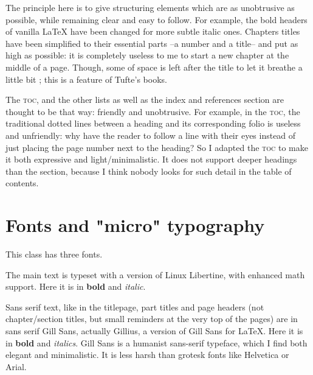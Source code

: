 \documentclass[
    11pt,
]{tufte-style-thesis}
\begin{document}
The principle here is to give structuring elements which are as unobtrusive as possible, while remaining clear and easy to follow. For example, the bold headers of vanilla \LaTeX{} have been changed for more subtle italic ones. Chapters titles have been simplified to their essential parts --a number and a title-- and put as high as possible: it is completely useless to me to start a new chapter at the middle of a page. Though, some of space is left after the title to let it breathe a little bit ; this is a feature of Tufte's books.

The \textsc{toc}, and the other lists as well as the index and references section are thought to be that way: friendly and unobtrusive. For example, in the \textsc{toc}, the traditional dotted lines between a heading and its corresponding folio is useless and unfriendly: why have the reader to follow a line with their eyes instead of just placing the page number next to the heading? So I adapted the \textsc{toc} to make it both expressive and light/minimalistic. It does not support deeper headings than the section, because I think nobody looks for such detail in the table of contents.


\section{Fonts and "micro" typography}

This class has three fonts.

The main text is typeset with a version of Linux Libertine, with enhanced math support. Here it is in \textbf{bold} and \textit{italic}.

Sans serif text, like in the titlepage, part titles and page headers (not chapter/section titles, but small reminders at the very top of the pages) are in sans serif {\sffamily Gill Sans}, actually Gillius, a version of Gill Sans for \LaTeX{}. Here it is in {\sffamily\bfseries bold} and {\sffamily\itshape italics}. Gill Sans is a humanist sans-serif typeface, which I find both elegant and minimalistic. It is less harsh than grotesk fonts like Helvetica or Arial.
\end{document}
